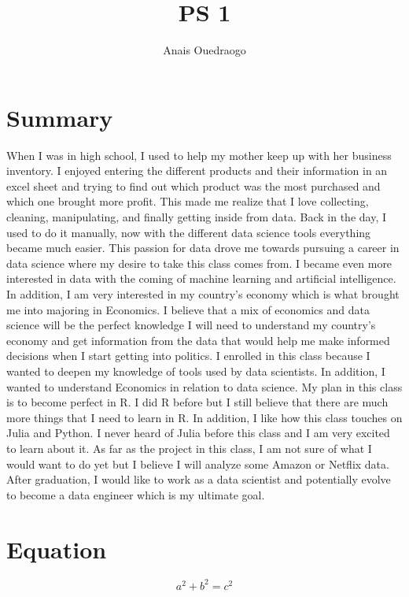 \documentclass{article}
\title{PS 1}
\author{Anais Ouedraogo}
\begin{document}
\maketitle

\section{Summary}
When I was in high school, I used to help my mother keep up with her business inventory. I enjoyed entering the different products and their information in an excel sheet and trying to find out which product was the most purchased and which one brought more profit. This made me realize that I love collecting, cleaning, manipulating, and finally getting inside from data. Back in the day, I used to do it manually, now with the different data science tools everything became much easier. This passion for data drove me towards pursuing a career in data science where my desire to take this class comes from. I became even more interested in data with the coming of machine learning and artificial intelligence. In addition, I am very interested in my country's economy which is what brought me into majoring in Economics. I believe that a mix of economics and data science will be the perfect knowledge I will need to understand my country's economy and get information from the data that would help me make informed decisions when I start getting into politics.
I enrolled in this class because I wanted to deepen my knowledge of tools used by data scientists. In addition, I wanted to understand Economics in relation to data science. My plan in this class is to become perfect in R. I did R before but I still believe that there are much more things that I need to learn in R. In addition, I like how this class touches on Julia and Python. I never heard of Julia before this class and I am very excited to learn about it.
As far as the project in this class, I am not sure of what I would want to do yet but I believe I will analyze some Amazon or Netflix data.
After graduation, I would like to work as a data scientist and potentially evolve to become a data engineer which is my ultimate goal.

\section{Equation}

\[a^2+b^2=c^2\]
\end{document}
